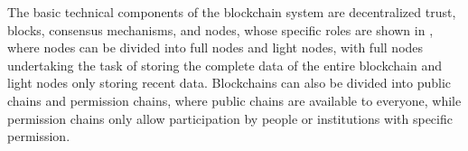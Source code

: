 The basic technical components of the blockchain system are decentralized trust, blocks, consensus mechanisms, and nodes\cite{LIM2021107133}, whose specific roles are shown in , where nodes can be divided into full nodes and light nodes, with full nodes undertaking the task of storing the complete data of the entire blockchain and light nodes only storing recent data. Blockchains can also be divided into public chains and permission chains\cite{permissionedandpublicblockchain}, where public chains are available to everyone, while permission chains only allow participation by people or institutions with specific permission.
\begin{table}[H]
    \centering

    \caption{Parts of a blockchain system}
    \label{Table:partsofblocks}
\end{table}

